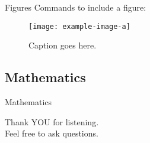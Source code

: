 \documentclass{beamer}
\begin{document}
\begin{frame}{Figures}
Commands to include a figure:
\begin{figure}
    \texttt{[image: example-image-a]}
    \caption{\label{fig:your-figure}Caption goes here.}
\end{figure}
\end{frame}

\subsection{Mathematics}

\begin{frame}{Mathematics}

\end{frame}

\begin{frame}
\centering
\Huge Thank YOU for listening.\\
\vskip30pt
\Huge Feel free to ask questions. \\
\end{frame}
\end{document}

